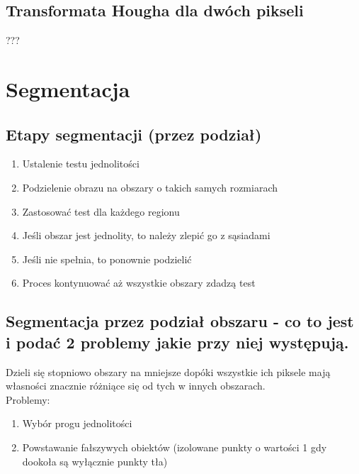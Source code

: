 \documentclass[a4paper, 12pt, titlepage]{article}
\begin{document}


\subsection{Transformata Hougha dla dwóch pikseli}
???

\pagebreak\section{Segmentacja}

\subsection{Etapy segmentacji (przez podział)}
\begin{enumerate}[noitemsep]
	\item Ustalenie testu jednolitości
	\item Podzielenie obrazu na obszary o takich samych rozmiarach
	\item Zastosować test dla każdego regionu
	\item Jeśli obszar jest jednolity, to należy zlepić go z sąsiadami
	\item Jeśli nie spełnia, to ponownie podzielić
	\item Proces kontynuować aż wszystkie obszary zdadzą test
\end{enumerate}


\subsection{Segmentacja przez podział obszaru - co to jest i podać 2 problemy jakie przy niej występują.}
Dzieli się stopniowo obszary na mniejsze dopóki wszystkie ich piksele mają własności znacznie różniące się od tych w innych obszarach.  \\
Problemy:
\begin{enumerate}[noitemsep]
	\item Wybór progu jednolitości
	\item Powstawanie fałszywych obiektów (izolowane punkty o wartości 1 gdy dookoła są wyłącznie punkty tła)
\end{enumerate}
\end{document}
